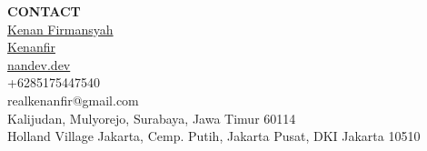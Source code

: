 \documentclass[11pt,a4paper]{article}
\newcommand{\sidesection}[1]{%
    {\large\bfseries\MakeUppercase{#1}}\\[6pt]%
}
\begin{document}
\begin{minipage}[t]{6cm}
\begin{minipage}[t]{5.5cm}
\sidesection{Contact}

 \href{https://linkedin.com/in/kenanfirmansyah}{Kenan Firmansyah}\\[6pt]
 \href{https://github.com/Kenanfir}{Kenanfir}\\[6pt]
 \href{https://nandev.dev}{nandev.dev}\\[6pt]
 +6285175447540\\[6pt]
 realkenanfir@gmail.com\\[10pt]

{\small\color{lighttext}Kalijudan, Mulyorejo, Surabaya, Jawa Timur 60114}\\[6pt]

{\small\color{lighttext}Holland Village Jakarta, Cemp. Putih, Jakarta Pusat, DKI Jakarta 10510}

\end{minipage}
\end{minipage}%
%
\end{document}
